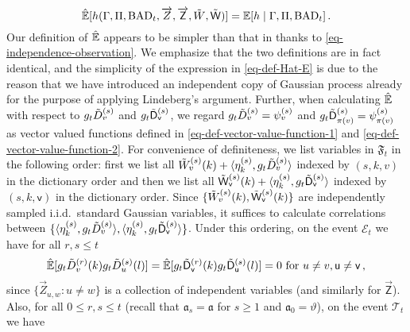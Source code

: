 \documentclass[11pt]{article}
\numberwithin{equation}{section}
\begin{document}
\begin{equation}\label{eq-def-Hat-E}
    \Hat{\mathbb{E}}[ h ( \Gamma, \Pi, \mathrm{BAD}_t, \overrightarrow{Z}, \overrightarrow{\mathsf{Z}},  \Tilde{W}, \Tilde{\mathsf{W}} ) ] = \mathbb{E} [ h \mid \Gamma, \Pi, \mathrm{BAD}_t ]\,.
\end{equation} Our definition of $\Hat{\mathbb E}$ appears to be simpler than that in 
 \cite{DL22+} thanks to \eqref{eq-independence-observation}. We emphasize that the two definitions are in fact identical, and the simplicity of the expression in \eqref{eq-def-Hat-E} is due to the reason that we have introduced an independent copy of Gaussian process already for the purpose of applying Lindeberg's argument.
Further, when calculating $\Hat{\mathbb{E}}$ with respect to $g_t \Tilde{D}^{(s)}_v$ and $g_t \Tilde{\mathsf{D}}^{(s)}_{\mathsf{v}}$, we regard $g_t \Tilde{D}^{(s)}_v = \psi_{v}^{(s)}$ and $g_t \Tilde{\mathsf{D}}^{(s)}_{\pi(v)} = \psi_{\pi(v)}^{(s)}$ as vector valued functions defined in \eqref{eq-def-vector-value-function-1} and \eqref{eq-def-vector-value-function-2}.
For convenience of definiteness, we list
variables in $\mathfrak{F}_t$ in the following order: first we list all $\Tilde{W}^{(s)}_v(k) + \langle \eta^{(s)}_k, g_t\Tilde{D}^{(s)}_v \rangle$ indexed by $(s,k,v)$ in the dictionary order and then we list all $\Tilde{\mathsf{W}}^{(s)}_{\mathsf{v}}(k) + \langle \eta^{(s)}_k, g_t \Tilde{\mathsf{D}}^{(s)}_{\mathsf{v}} \rangle$ indexed by $(s,k,\mathsf{v})$ in the dictionary order. Since $\{ \Tilde{W}^{(s)}_v(k), \Tilde{\mathsf{W}}^{(s)}_{\mathsf{v}}(k) \}$ are independently sampled i.i.d.\ standard Gaussian variables, it suffices to calculate correlations between $\{ \langle \eta^{(s)}_k, g_t\Tilde{D}^{(s)}_v \rangle, \langle \eta^{(s)}_k, g_t \Tilde{\mathsf{D}}^{(s)}_{\mathsf{v}} \rangle \}$. Under this ordering, on the event $\mathcal{E}_{t}$ we have for all $r,s \leq t$
\begin{align*}
    \Hat{\mathbb{E}} [ g_t\Tilde{D}^{(r)}_v (k) g_t\Tilde{D}^{(s)}_u (l) ] = \Hat{\mathbb{E}} [ g_t\Tilde{\mathsf{D}}^{(r)}_{\mathsf{v}}(k) g_t\Tilde{\mathsf{D}}^{(s)}_{\mathsf{u}} (l) ] =0 \mbox{ for } u \neq v, \mathsf{u \neq v} \,,
\end{align*}
since $\{\overrightarrow{Z}_{u,w}: u\neq w\}$ is a collection of independent variables (and similarly for $\overrightarrow{\mathsf Z}$). Also, for all $0 \leq r,s \leq t$ (recall that $\mathfrak{a}_s = \mathfrak{a}$ for $s \geq 1$ and $\mathfrak{a}_0 = \vartheta$), on the event $\mathcal T_t$ we have
\end{document}
